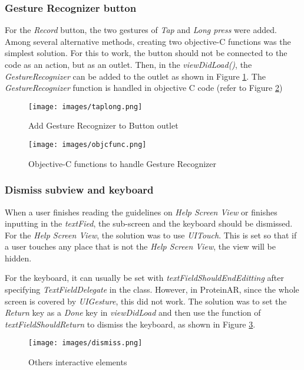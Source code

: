 \subsubsection{Gesture Recognizer button}
For the \emph{Record} button, the two gestures of \emph{Tap} and \emph{Long press} were added. Among several alternative methods, creating two objective-C functions was the simplest solution. For this to work, the button should not be connected to the code as an action, but as an outlet. Then, in the \emph{viewDidLoad()}, the \emph{GestureRecognizer} can be added to the outlet as shown in Figure \ref{fig:taplong}. The \emph{GestureRecognizer} function is handled in objective C code (refer to Figure \ref{fig:objcfunc})
\begin{figure}[!htp]
	\centering
	\texttt{[image: images/taplong.png]}
	\caption{Add Gesture Recognizer to Button outlet}
	\label{fig:taplong}
\end{figure}
\begin{figure}[!htp]
	\centering
	\texttt{[image: images/objcfunc.png]}
	\caption{Objective-C functions to handle Gesture Recognizer}
	\label{fig:objcfunc}
\end{figure}

\subsubsection{Dismiss subview and keyboard}
When a user finishes reading the guidelines on \emph{Help Screen View} or finishes inputting in the \emph{textFied}, the sub-screen and the keyboard should be dismissed. For the \emph{Help Screen View}, the solution was to use \emph{UITouch}. This is set so that if a user touches any place that is not the \emph{Help Screen View}, the view will be hidden. 

For the keyboard, it can usually be set with \emph{textFieldShouldEndEditting} after specifying \emph{TextFieldDelegate} in the class. However, in ProteinAR, since the whole screen is covered by \emph{UIGesture}, this did not work. The solution was to set the \emph{Return} key as a \emph{Done} key in \emph{viewDidLoad} and then use the function of \emph{textFieldShouldReturn} to dismiss the keyboard, as shown in Figure \ref{fig:dismiss}.

\begin{figure}[!htp]
	\centering
	\texttt{[image: images/dismiss.png]}
	\caption{Others interactive elements}
	\label{fig:dismiss}
\end{figure}

